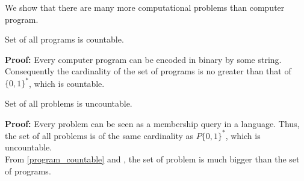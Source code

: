 We show that there are many more computational problems than
computer program.

\begin{claim}
    \label{program_countable}
    Set of all programs is countable.
\end{claim}

\textbf{Proof:} Every computer program can be encoded in binary
by some string. Consequently the cardinality of the set of programs
is no greater than that of ${\{0, 1\}}^{*}$, which is countable.

\begin{claim}
    \label{problem_uncountable}
    Set of all problems is uncountable.
\end{claim}

\textbf{Proof:} Every problem can be seen as a membership query in
a language. Thus, the set of all problems is of the same cardinality
as $P{\{0, 1\}}^{*}$, which is uncountable.\\

From \ref{program_countable} and \label{problem_uncountable}, 
the set of problem is much bigger than the set of programs.
